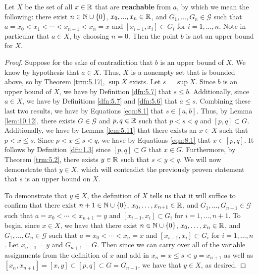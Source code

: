 \documentclass[../main.tex]{subfiles}
\begin{document}
\begin{lemma}\label{lem:10.13}
    Let $X$ be the set of all $x\in\mathbb{R}$ that are \textbf{reachable} from $a$, by which we mean the following: there exist $n\in\mathbb{N}\cup\{0\}$, $x_0,...,x_n\in\mathbb{R}$, and $G_1,\dots,G_n\in\mathcal{G}$ such that $a=x_0<x_1<\cdots<x_{n-1}<x_n=x$ and $[x_{i-1},x_i]\subset G_i$ for $i=1,\dots,n$. Note in particular that $a\in X$, by choosing $n=0$. Then the point $b$ is not an upper bound for $X$.
    \begin{proof}
        Suppose for the sake of contradiction that $b$ is an upper bound of $X$. We know by hypothesis that $a\in X$. Thus, $X$ is a nonempty set that is bounded above, so by Theorem \ref{trm:5.17}, $\sup X$ exists. Let $s=\sup X$. Since $b$ is an upper bound of $X$, we have by Definition \ref{dfn:5.7} that $s\leq b$. Additionally, since $a\in X$, we have by Definitions \ref{dfn:5.7} and \ref{dfn:5.6} that $a\leq s$. Combining these last two results, we have by Equations \ref{eqn:8.1} that $s\in[a,b]$. Thus, by Lemma \ref{lem:10.12}, there exists $G\in\mathcal{G}$ and $p,q\in\mathbb{R}$ such that $p<s<q$ and $[p,q]\subset G$. Additionally, we have by Lemma \ref{lem:5.11} that there exists an $x\in X$ such that $p<x\leq s$. Since $p<x\leq s<q$, we have by Equations \ref{eqn:8.1} that $x\in[p,q]$. It follows by Definition \ref{dfn:1.3} since $[p,q]\subset G$ that $x\in G$. Furthermore, by Theorem \ref{trm:5.2}, there exists $y\in\mathbb{R}$ such that $s<y<q$. We will now demonstrate that $y\in X$, which will contradict the previously proven statement that $s$ is an upper bound on $X$.\par
        To demonstrate that $y\in X$, the definition of $X$ tells us that it will suffice to confirm that there exist $n+1\in\mathbb{N}\cup\{0\}$, $x_0,\dots,x_{n+1}\in\mathbb{R}$, and $G_1,\dots,G_{n+1}\in\mathcal{G}$ such that $a=x_0<\cdots<x_{n+1}=y$ and $[x_{i-1},x_i]\subset G_i$ for $i=1,\dots,n+1$. To begin, since $x\in X$, we have that there exist $n\in\mathbb{N}\cup\{0\}$, $x_0,\dots,x_n\in\mathbb{R}$, and $G_1,\dots,G_n\in\mathcal{G}$ such that $a=x_0<\cdots<x_n=x$ and $[x_{i-1},x_i]\subset G_i$ for $i=1,\dots,n$. Let $x_{n+1}=y$ and $G_{n+1}=G$. Then since we can carry over all of the variable assignments from the definition of $x$ and add in $x_n=x\leq s<y=x_{n+1}$ as well as $[x_n,x_{n+1}]=[x,y]\subset[p,q]\subset G=G_{n+1}$, we have that $y\in X$, as desired.
    \end{proof}
\end{lemma}
\end{document}
